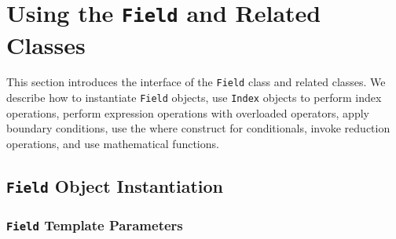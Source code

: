 \chapter{Using the \texttt{Field} and Related Classes}

This section introduces the interface of the \texttt{Field} class and related classes. We describe how
to instantiate \texttt{Field} objects, use \texttt{Index} objects to perform index operations, perform expression
operations with overloaded operators, apply boundary conditions, use the where construct for
conditionals, invoke reduction operations, and use mathematical functions.

\section{\texttt{Field} Object Instantiation}

\subsection{\texttt{Field} Template Parameters} \label{sec:tmpl_params}

